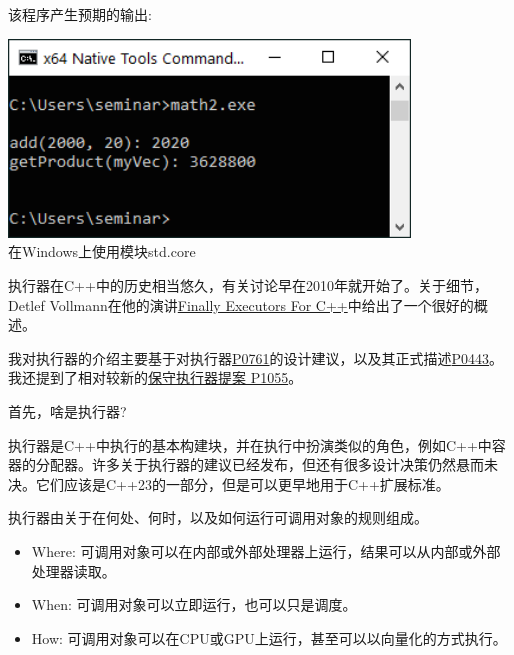 该程序产生预期的输出:

\begin{center}
\includegraphics[width=0.8\textwidth]{content/5/chapter8/images/7.png}\\
在Windows上使用模块std.core
\end{center}


执行器在C++中的历史相当悠久，有关讨论早在2010年就开始了。关于细节，Detlef Vollmann在他的演讲\href{http://www.vollmann.ch/en/presentations/executors2018.pdf}{Finally Executors For C++}中给出了一个很好的概述。

我对执行器的介绍主要基于对执行器\href{http://www.open-std.org/jtc1/sc22/wg21/docs/papers/2018/p0761r2.pdf}{P0761}的设计建议，以及其正式描述\href{http://open-std.org/JTC1/SC22/WG21/docs/papers/2018/p0443r7.html}{P0443}。我还提到了相对较新的\href{http://open-std.org/JTC1/SC22/WG21/docs/papers/2018/p1055r0.pdf}{保守执行器提案 P1055}。

首先，啥是执行器?

执行器是C++中执行的基本构建块，并在执行中扮演类似的角色，例如C++中容器的分配器。许多关于执行器的建议已经发布，但还有很多设计决策仍然悬而未决。它们应该是C++23的一部分，但是可以更早地用于C++扩展标准。

执行器由关于在何处、何时，以及如何运行可调用对象的规则组成。

\begin{itemize}
\item 
Where: 可调用对象可以在内部或外部处理器上运行，结果可以从内部或外部处理器读取。

\item 
When: 可调用对象可以立即运行，也可以只是调度。

\item 
How: 可调用对象可以在CPU或GPU上运行，甚至可以以向量化的方式执行。
\end{itemize}


